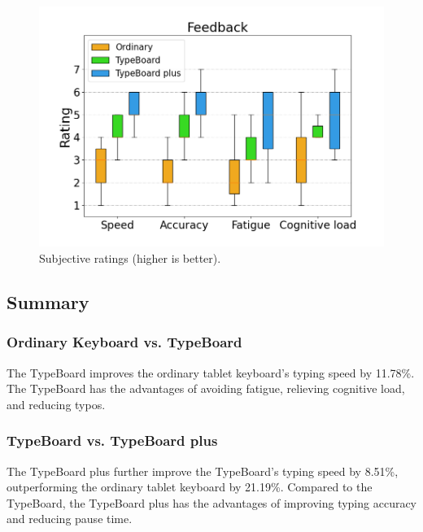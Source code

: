 \begin{figure}[!tbh]
	\includegraphics[width=0.6\linewidth]{figures/subjective_feedback.png}
	\centering
	\caption{Subjective ratings (higher is better).}
	\label{fig:subjective_feedback}
\end{figure}

\subsection{Summary}

\subsubsection{Ordinary Keyboard vs. TypeBoard}

The TypeBoard improves the ordinary tablet keyboard's typing speed by 11.78\%. The TypeBoard has the advantages of avoiding fatigue, relieving cognitive load, and reducing typos.

\subsubsection{TypeBoard vs. TypeBoard plus}

The TypeBoard plus further improve the TypeBoard's typing speed by 8.51\%, outperforming the ordinary tablet keyboard by 21.19\%. Compared to the TypeBoard, the TypeBoard plus has the advantages of improving typing accuracy and reducing pause time.
